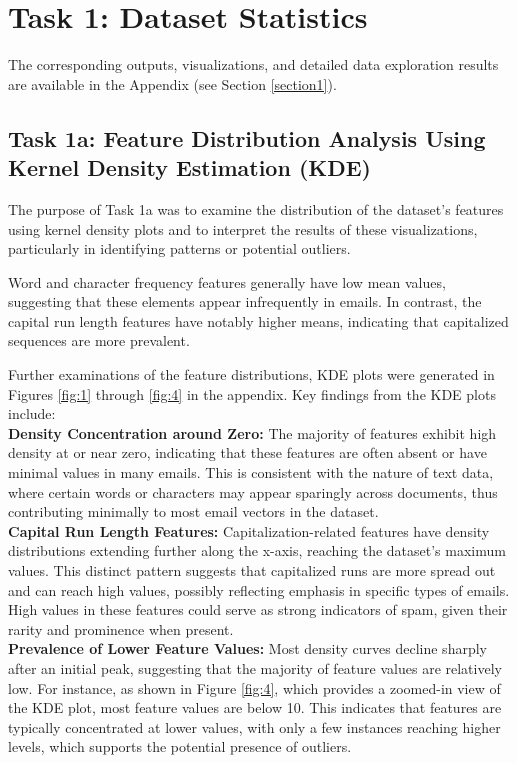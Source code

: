 \documentclass[a4paper,oneside,bibliography=totoc]{scrartcl}
\begin{document}
\section{Task 1: Dataset Statistics} The corresponding outputs, visualizations, and detailed data exploration results are available in the Appendix (see Section \ref{section1}).

\subsection{Task 1a: Feature Distribution Analysis Using Kernel Density Estimation (KDE)}
The purpose of Task 1a was to examine the distribution of the dataset’s features using kernel density plots and to interpret the results of these visualizations, particularly in identifying patterns or potential outliers.

Word and character frequency features generally have low mean values, suggesting that these elements appear infrequently in emails. In contrast, the capital run length features have notably higher means, indicating that capitalized sequences are more prevalent.

Further examinations of the feature distributions, KDE plots were generated in Figures \ref{fig:1} through \ref{fig:4} in the appendix. Key findings from the KDE plots include:\\
\textbf{Density Concentration around Zero:} The majority of features exhibit high density at or near zero, indicating that these features are often absent or have minimal values in many emails. This is consistent with the nature of text data, where certain words or characters may appear sparingly across documents, thus contributing minimally to most email vectors in the dataset.\\
 \textbf{Capital Run Length Features:} Capitalization-related features have density distributions extending further along the x-axis, reaching the dataset’s maximum values. This distinct pattern suggests that capitalized runs are more spread out and can reach high values, possibly reflecting emphasis in specific types of emails. High values in these features could serve as strong indicators of spam, given their rarity and prominence when present.\\
 \textbf{Prevalence of Lower Feature Values:} Most density curves decline sharply after an initial peak, suggesting that the majority of feature values are relatively low. For instance, as shown in Figure \ref{fig:4}, which provides a zoomed-in view of the KDE plot, most feature values are below 10. This indicates that features are typically concentrated at lower values, with only a few instances reaching higher levels, which supports the potential presence of outliers.
\end{document}
